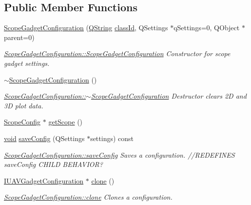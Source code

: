 \subsection*{Public Member Functions}
\begin{DoxyCompactItemize}
\item 
\hyperlink{group___scope_plugin_ga08c3c3b7c00b5fca9d78f97f6ae66381}{Scope\-Gadget\-Configuration} (\hyperlink{group___u_a_v_objects_plugin_gab9d252f49c333c94a72f97ce3105a32d}{Q\-String} \hyperlink{group___core_plugin_gac953657221ba7fda967ada0408332641}{class\-Id}, Q\-Settings $\ast$q\-Settings=0, Q\-Object $\ast$parent=0)
\begin{DoxyCompactList}\small\item\em \hyperlink{group___scope_plugin_ga08c3c3b7c00b5fca9d78f97f6ae66381}{Scope\-Gadget\-Configuration\-::\-Scope\-Gadget\-Configuration} Constructor for scope gadget settings. \end{DoxyCompactList}\item 
\hyperlink{group___scope_plugin_ga3a4bf5369afe5c90183e5de5b9a64c99}{$\sim$\-Scope\-Gadget\-Configuration} ()
\begin{DoxyCompactList}\small\item\em \hyperlink{group___scope_plugin_ga3a4bf5369afe5c90183e5de5b9a64c99}{Scope\-Gadget\-Configuration\-::$\sim$\-Scope\-Gadget\-Configuration} Destructor clears 2\-D and 3\-D plot data. \end{DoxyCompactList}\item 
\hyperlink{class_scope_config}{Scope\-Config} $\ast$ \hyperlink{group___scope_plugin_gad77c6650f45b62d917a93db28ddbcc56}{get\-Scope} ()
\item 
\hyperlink{group___u_a_v_objects_plugin_ga444cf2ff3f0ecbe028adce838d373f5c}{void} \hyperlink{group___scope_plugin_ga1019b17dbc40bb39cb4deb12fe85912e}{save\-Config} (Q\-Settings $\ast$settings) const 
\begin{DoxyCompactList}\small\item\em \hyperlink{group___scope_plugin_ga1019b17dbc40bb39cb4deb12fe85912e}{Scope\-Gadget\-Configuration\-::save\-Config} Saves a configuration. //\-R\-E\-D\-E\-F\-I\-N\-E\-S save\-Config C\-H\-I\-L\-D B\-E\-H\-A\-V\-I\-O\-R? \end{DoxyCompactList}\item 
\hyperlink{group___core_plugin_gacdfdf0b1e39b5002472b76b6564ce51f}{I\-U\-A\-V\-Gadget\-Configuration} $\ast$ \hyperlink{group___scope_plugin_ga85df073ffa0cd27035a937df7c2cff8e}{clone} ()
\begin{DoxyCompactList}\small\item\em \hyperlink{group___scope_plugin_ga85df073ffa0cd27035a937df7c2cff8e}{Scope\-Gadget\-Configuration\-::clone} Clones a configuration. \end{DoxyCompactList}\item 

\end{DoxyCompactItemize}
